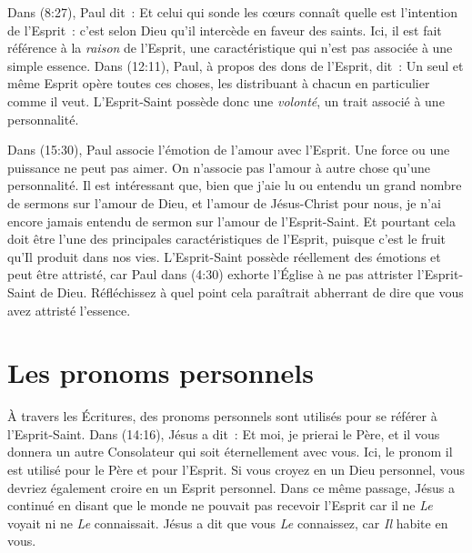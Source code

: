 Dans (8:27), Paul dit~: \og Et celui qui sonde les cœurs
 connaît quelle est l'intention de l'Esprit~: c'est selon Dieu qu'il
 intercède en faveur des saints. \fg{} Ici, il est fait référence
 à la \emph{raison} de l'Esprit, une caractéristique qui n'est pas associée à
 une simple essence. Dans (12:11), Paul, à propos des dons de
 l'Esprit, dit~: \og Un seul et même Esprit opère toutes ces choses, les
 distribuant à chacun en particulier comme il veut. \fg{} L'Esprit-Saint
 possède donc une \emph{volonté}, un trait associé à une personnalité.

Dans (15:30), Paul associe l'émotion de l'amour avec l'Esprit.
 Une force ou une puissance ne peut pas aimer. On n'associe pas l'amour à autre
 chose qu'une personnalité. Il est intéressant que, bien que j'aie lu ou
 entendu un grand nombre de sermons sur l'amour de Dieu, et l'amour de
 Jésus-Christ pour nous, je n'ai encore jamais entendu de sermon sur l'amour de
 l'Esprit-Saint. Et pourtant cela doit être l'une des principales
 caractéristiques de l'Esprit, puisque c'est le fruit qu'Il produit dans nos
 vies. L'Esprit-Saint possède réellement des émotions et peut être attristé,
 car Paul dans (4:30) exhorte l'Église à ne pas attrister
 l'Esprit-Saint de Dieu. Réfléchissez à quel point cela paraîtrait abherrant
 de dire que vous avez attristé l'essence.


\section*{Les pronoms personnels}

À travers les Écritures, des pronoms personnels sont utilisés pour se
 référer à l'Esprit-Saint. Dans (14:16), Jésus a dit~:
 \og Et moi, je prierai le Père, et il vous donnera un autre Consolateur
 qui soit éternellement avec vous. \fg{}
 Ici, le pronom \og il \fg{} est utilisé pour le Père et pour l'Esprit.
 Si vous croyez en un Dieu personnel, vous devriez également croire en
 un Esprit personnel. Dans ce même passage, Jésus a continué en disant
 que le monde ne pouvait pas recevoir l'Esprit car il ne \emph{Le} voyait ni
 ne \emph{Le} connaissait. Jésus a dit que vous \emph{Le} connaissez,
 car \emph{Il} habite en vous.


